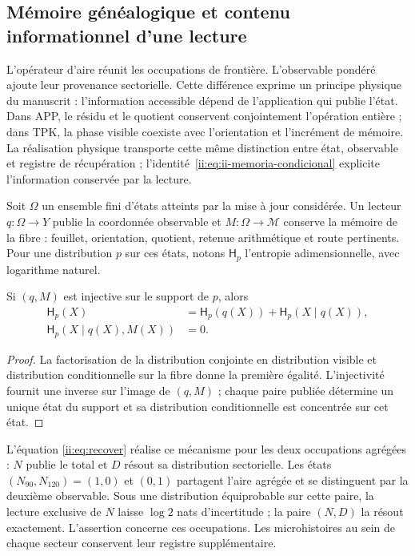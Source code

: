 \subsection{Mémoire généalogique et contenu informationnel d'une lecture}
\label{ii:sec:ii-memoria-lectura}

L’opérateur d’aire réunit les occupations de frontière. L’observable
pondéré ajoute leur provenance sectorielle. Cette différence exprime un
principe physique du manuscrit : l’information accessible dépend de
l’application qui publie l’état. Dans APP, le résidu et le quotient
conservent conjointement l’opération entière ; dans TPK, la phase visible
coexiste avec l’orientation et l’incrément de mémoire. La réalisation
physique transporte cette même distinction entre état, observable et
registre de récupération ; l’identité~\eqref{ii:eq:ii-memoria-condicional} explicite l’information conservée par la lecture.

Soit \(\Omega\) un ensemble fini d'états atteints par la
mise à jour considérée. Un lecteur \(q:\Omega\to Y\) publie la
coordonnée observable et \(M:\Omega\to\mathcal M\) conserve la mémoire
de la fibre : feuillet, orientation, quotient, retenue arithmétique et route pertinents.
Pour une distribution \(p\) sur ces états, notons
\(\mathsf H_p\) l'entropie adimensionnelle, avec logarithme naturel.

\begin{proposition}
Si \((q,M)\) est injective sur le support de \(p\), alors
\begin{align}
 \mathsf H_p(X)&=\mathsf H_p(q(X))+
                 \mathsf H_p(X\mid q(X)),\\
 \mathsf H_p(X\mid q(X),M(X))&=0.
 \label{ii:eq:ii-memoria-condicional}
\end{align}
\end{proposition}
\begin{proof}
La factorisation de la distribution conjointe en distribution visible
et distribution conditionnelle sur la fibre donne la première égalité.
L'injectivité fournit une inverse sur l'image de \((q,M)\) ;
chaque paire publiée détermine un unique état du support et sa
distribution conditionnelle est concentrée sur cet état.
\end{proof}

L'équation \eqref{ii:eq:recover} réalise ce mécanisme pour les deux
occupations agrégées : \(N\) publie le total et \(D\) résout sa
distribution sectorielle. Les états \((N_{90},N_{120})=(1,0)\) et
\((0,1)\) partagent l'aire agrégée et se distinguent par la deuxième
observable. Sous une distribution équiprobable sur cette paire, la
lecture exclusive de \(N\) laisse \(\log2\) nats d'incertitude ;
la paire \((N,D)\) la résout exactement. L'assertion concerne
ces occupations. Les microhistoires au sein de chaque secteur conservent
leur registre supplémentaire.

